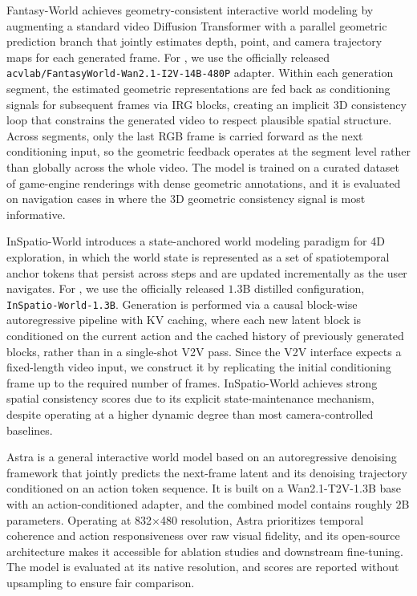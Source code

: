 Fantasy-World achieves geometry-consistent interactive world modeling by augmenting a standard video Diffusion Transformer with a parallel geometric prediction branch that jointly estimates depth, point, and camera trajectory maps for each generated frame.
For \benchmark, we use the officially released \texttt{acvlab/FantasyWorld-Wan2.1-I2V-14B-480P} adapter.
Within each generation segment, the estimated geometric representations are fed back as conditioning signals for subsequent frames via IRG blocks, creating an implicit 3D consistency loop that constrains the generated video to respect plausible spatial structure.
Across segments, only the last RGB frame is carried forward as the next conditioning input, so the geometric feedback operates at the segment level rather than globally across the whole video.
The model is trained on a curated dataset of game-engine renderings with dense geometric annotations, and it is evaluated on navigation cases in \benchmark where the 3D geometric consistency signal is most informative.

InSpatio-World introduces a state-anchored world modeling paradigm for 4D exploration, in which the world state is represented as a set of spatiotemporal anchor tokens that persist across steps and are updated incrementally as the user navigates.
For \benchmark, we use the officially released $1.3$B distilled configuration, \texttt{InSpatio-World-1.3B}.
Generation is performed via a causal block-wise autoregressive pipeline with KV caching, where each new latent block is conditioned on the current action and the cached history of previously generated blocks, rather than in a single-shot V2V pass.
Since the V2V interface expects a fixed-length video input, we construct it by replicating the initial conditioning frame up to the required number of frames.
InSpatio-World achieves strong spatial consistency scores due to its explicit state-maintenance mechanism, despite operating at a higher dynamic degree than most camera-controlled baselines.

Astra is a general interactive world model based on an autoregressive denoising framework that jointly predicts the next-frame latent and its denoising trajectory conditioned on an action token sequence.
It is built on a Wan2.1-T2V-1.3B base with an action-conditioned adapter, and the combined model contains roughly $2$B parameters.
Operating at 832$\times$480 resolution, Astra prioritizes temporal coherence and action responsiveness over raw visual fidelity, and its open-source architecture makes it accessible for ablation studies and downstream fine-tuning.
The model is evaluated at its native resolution, and scores are reported without upsampling to ensure fair comparison.

